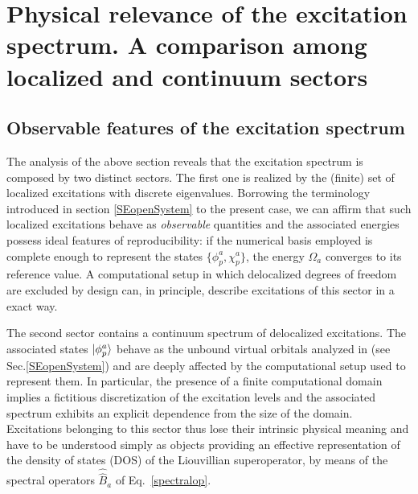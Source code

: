 \documentclass[reprint,aps,prb]{revtex4-1}
\newcommand{\op}[1]{\hat {#1}}
\newcommand{\sop}[1]{\op{\op {#1}}}
\begin{document}
\section{Physical relevance of the excitation spectrum. A comparison among localized and continuum sectors}

\subsection{Observable features of the excitation spectrum}

The analysis of the above section reveals that the excitation spectrum is composed by two distinct sectors.
The first one is realized by the (finite) set of localized excitations with discrete eigenvalues.
Borrowing the terminology introduced in section \ref{SEopenSystem} to the present case, we can affirm that such localized excitations behave as
\emph{observable} quantities and the associated energies possess ideal features of reproducibility:
if the numerical basis employed is complete enough to
represent the states $\{\phi_p^a,\chi_p^a\}$, the energy $\Omega_a$
converges to its reference value.
A computational setup in which delocalized degrees of freedom are excluded by design can, in principle, describe excitations of this sector in a exact way.

The second sector contains a continuum spectrum of delocalized excitations. The associated states $\ket{\phi_p^a}$ behave as the unbound virtual orbitals analyzed in \cite{boffi2016} (see Sec.\ref{SEopenSystem})
and are deeply affected by the computational setup used to represent them. In particular, the presence of a finite computational domain implies a fictitious discretization of the excitation levels and
the associated spectrum exhibits an explicit dependence from the size of the domain.
Excitations belonging to this sector thus lose their intrinsic physical meaning and have to be understood simply as objects providing an effective representation of the density of states (DOS) of the Liouvillian superoperator, by means of the spectral operators $\sop B_a$ of Eq.~\eqref{spectralop}.
\end{document}
